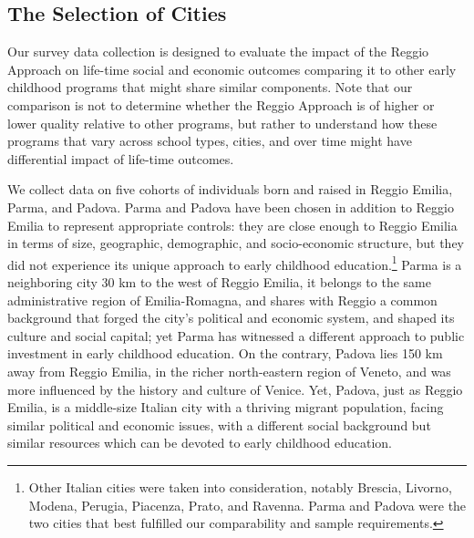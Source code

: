\subsection{The Selection of Cities}
Our survey data collection is designed to evaluate the impact of the Reggio Approach on life-time social and economic outcomes comparing it to other early childhood programs that might share similar components. Note that our comparison is not to determine whether the Reggio Approach is of higher or lower quality relative to other programs, but rather to understand how these programs that vary across school types, cities, and over time might have differential impact of life-time outcomes.

We collect data on five cohorts of individuals born and raised in Reggio Emilia, Parma, and Padova. Parma and Padova have been chosen in addition to Reggio Emilia to represent appropriate controls: they are close enough to Reggio Emilia in terms of size, geographic, demographic, and socio-economic structure, but they did not experience its unique approach to early childhood education.\footnote{Other Italian cities were taken into consideration, notably Brescia, Livorno, Modena, Perugia, Piacenza, Prato, and Ravenna. Parma and Padova were the two cities that best fulfilled our comparability and sample requirements.} Parma is a neighboring city 30 km to the west of Reggio Emilia, it belongs to the same administrative region of Emilia-Romagna, and shares with Reggio a common background that forged the city's political and economic system, and shaped its culture and social capital; yet Parma has witnessed a different approach to public investment in early childhood education. On the contrary, Padova lies 150 km away from Reggio Emilia, in the richer north-eastern region of Veneto, and was more influenced by the history and culture of Venice. Yet, Padova, just as Reggio Emilia, is a middle-size Italian city with a thriving migrant population, facing similar political and economic issues, with a different social background but similar resources which can be devoted to early childhood education.

